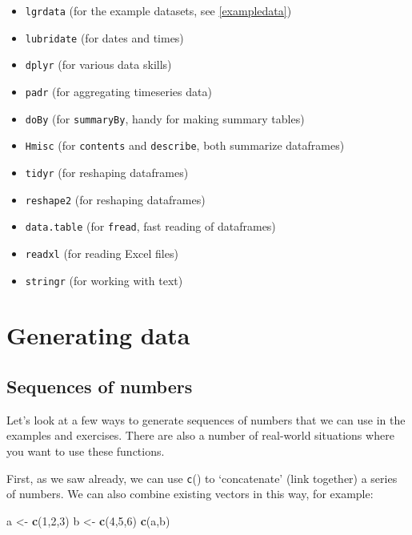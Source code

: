 \documentclass[]{book}
\newenvironment{Shaded}{\begin{snugshade}}{\end{snugshade}}
\newcommand{\DecValTok}[1]{\textcolor[rgb]{0.00,0.00,0.81}{#1}}
\newcommand{\KeywordTok}[1]{\textcolor[rgb]{0.13,0.29,0.53}{\textbf{#1}}}
\newcommand{\NormalTok}[1]{#1}
\newcommand{\StringTok}[1]{\textcolor[rgb]{0.31,0.60,0.02}{#1}}
\providecommand{\tightlist}{%
  \setlength{\itemsep}{0pt}\setlength{\parskip}{0pt}}
\begin{document}
\begin{itemize}
\tightlist
\item
  \texttt{lgrdata} (for the example datasets, see \ref{exampledata})
\item
  \texttt{lubridate} (for dates and times)
\item
  \texttt{dplyr} (for various data skills)
\item
  \texttt{padr} (for aggregating timeseries data)
\item
  \texttt{doBy} (for \texttt{summaryBy}, handy for making summary tables)
\item
  \texttt{Hmisc} (for \texttt{contents} and \texttt{describe}, both summarize dataframes)
\item
  \texttt{tidyr} (for reshaping dataframes)
\item
  \texttt{reshape2} (for reshaping dataframes)
\item
  \texttt{data.table} (for \texttt{fread}, fast reading of dataframes)
\item
  \texttt{readxl} (for reading Excel files)
\item
  \texttt{stringr} (for working with text)
\end{itemize}

\hypertarget{generating-data}{%
\section{Generating data}\label{generating-data}}

\hypertarget{sequences}{%
\subsection{Sequences of numbers}\label{sequences}}

Let's look at a few ways to generate sequences of numbers that we can use in the examples and exercises. There are also a number of real-world situations where you want to use these functions.

First, as we saw already, we can use \texttt{c}() to `concatenate' (link together) a series of numbers. We can also combine existing vectors in this way, for example:

\begin{Shaded}
\begin{Highlighting}[]
\NormalTok{a <-}\StringTok{ }\KeywordTok{c}\NormalTok{(}\DecValTok{1}\NormalTok{,}\DecValTok{2}\NormalTok{,}\DecValTok{3}\NormalTok{)}
\NormalTok{b <-}\StringTok{ }\KeywordTok{c}\NormalTok{(}\DecValTok{4}\NormalTok{,}\DecValTok{5}\NormalTok{,}\DecValTok{6}\NormalTok{)}
\KeywordTok{c}\NormalTok{(a,b)}
\end{Highlighting}
\end{Shaded}
\end{document}
